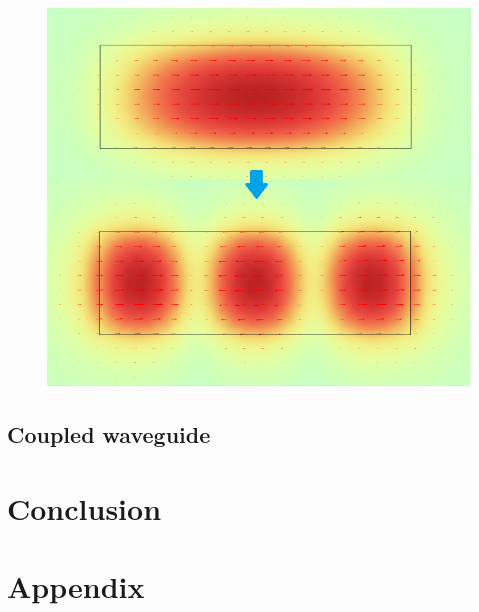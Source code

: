 \documentclass[conference, a4paper]{IEEEtran}
\begin{document}
\begin{figure}[H]
    \centering
    \includegraphics[scale=0.3]{normE_different_modes.png}
    \caption{}
    \label{fig:dif_modes}
\end{figure}

\subsection{Coupled waveguide}
\label{subsec:rectangle_coupled}

\section{Conclusion}
\label{sec:conclusion}

\section*{Appendix}
\label{sec:appendix}

% 
% 
\end{document}
